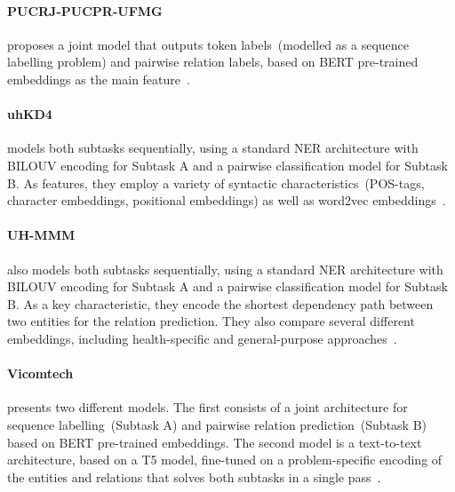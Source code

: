 \documentclass[a4paper,11pt,twocolumn,twoside]{article}
\begin{document}
\paragraph{PUCRJ-PUCPR-UFMG} proposes a joint model that outputs token labels~(modelled as a sequence labelling problem) and pairwise relation labels, based on BERT pre-trained embeddings as the main feature~\cite{lucas2021}.

\paragraph{uhKD4} models both subtasks sequentially, using a standard NER architecture with BILOUV encoding for Subtask A and a pairwise classification model for Subtask B. As features, they employ a variety of syntactic characteristics~(POS-tags, character embeddings, positional embeddings) as well as word2vec embeddings~\cite{uhKD42021}.

\paragraph{UH-MMM} also models both subtasks sequentially, using a standard NER architecture with BILOUV encoding for Subtask A and a pairwise classification model for Subtask B. As a key characteristic, they encode the shortest dependency path between two entities for the relation prediction. They also compare several different embeddings, including health-specific and general-purpose approaches~\cite{uhmmm2021}.

\paragraph{Vicomtech} presents two different models. The first consists of a joint architecture for sequence labelling~(Subtask A) and pairwise relation prediction~(Subtask B) based on BERT pre-trained embeddings. The second model is a text-to-text architecture, based on a T5 model, fine-tuned on a problem-specific encoding of the entities and relations that solves both subtasks in a single pass~\cite{vicomtech2021}.
\end{document}
